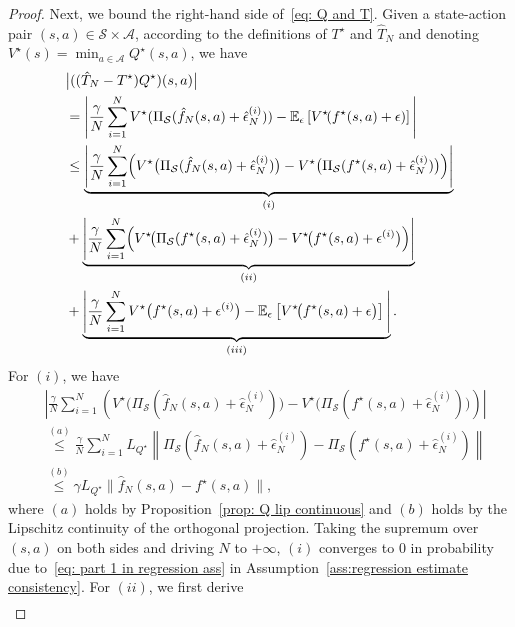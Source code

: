 \documentclass[letterpaper, 10 pt, conference]{ieeeconf}  %
\begin{document}
\begin{proof}
Next, we bound the right-hand side of\ \eqref{eq: Q and T}. Given a state-action pair $(s,a)\in\mathcal S\times\mathcal A$, according to the definitions of $T^\star$ and $\hat{T}_N$ and denoting $V^\star(s)=\min_{a\in\mathcal A}Q^\star(s,a)$, we have
\footnotesize
\begin{align*}
&\bigl|((\hat{T}_N-T^\star)Q^\star)(s,a)\bigr| \\
&=\Bigg|
\frac{\gamma}{N}\sum_{i=1}^{N}V^\star(\Pi_{\mathcal{S}}(\hat f_N(s,a)+\hat\epsilon_N^{(i)}))
- \mathbb E_\epsilon\left[V^\star\!(f^\star(s,a)+\epsilon)\right]
\Bigg|\nonumber \\
&\le \underbrace{\Bigg|
\frac{\gamma}{N}\sum_{i=1}^{N}\Bigl(
V^\star\bigl(\Pi_{\mathcal{S}}(\hat f_N(s,a)+\hat\epsilon_N^{(i)})\bigr)
-V^\star\bigl(\Pi_{\mathcal S}(f^\star(s,a)+\hat\epsilon_N^{(i)})\bigr)
\Bigr)\Bigg|}_{(i)}\\
& + \underbrace{\Bigg|
\frac{\gamma}{N}\sum_{i=1}^{N}\Bigl(
V^\star\!\bigl( \Pi_{\mathcal S}(f^\star(s,a)+\hat\epsilon_N^{(i)})\bigr)
-V^\star\!\bigl(f^\star(s,a)+\epsilon^{(i)}\bigr)
\Bigr)\Bigg|}_{(ii)}\\
& +\underbrace{ \Bigg|
\frac{\gamma}{N}\sum_{i=1}^{N}V^\star\bigl(f^\star(s,a)+\epsilon^{(i)}\bigr)
-\mathbb E_\epsilon\left[V^\star\!\bigl(f^\star(s,a)+\epsilon\bigr)\right]
\Bigg|}_{(iii)}.
\end{align*}
\normalsize
For $(i)$, we have
\allowdisplaybreaks
\small 
\begin{align}
& \left| \frac{\gamma}{N} \sum_{i=1}^N \left(
V^\star\!\bigl(\Pi_{\mathcal S}(\hat f_N(s,a)+\hat\epsilon_N^{(i)})\bigr)
-V^\star\bigl(\Pi_{\mathcal S}(f^\star(s,a)+\hat\epsilon_N^{(i)})\bigr)\right)
\right|\nonumber\\
 & \overset{(a)}{\le} \frac{\gamma}{N} \sum_{i=1}^N  L_{Q^\star}\left\|\Pi_{\mathcal S}(\hat f_N(s,a)+\hat\epsilon_N^{(i)}) - \Pi_{\mathcal S}(f^\star(s,a)+\hat\epsilon_N^{(i)})\right\| \nonumber \\
& \overset{(b)}{\le} \gamma L_{Q^\star}\|\hat f_N(s,a)-f^\star(s,a)\|,\nonumber
\end{align}
\normalsize
where $(a)$ holds by Proposition\ \ref{prop: Q lip continuous} and $(b)$ holds by the Lipschitz continuity of the orthogonal projection. Taking the supremum over $(s,a)$ on both sides and driving $N$ to $+\infty$, $(i)$ converges to $0$ in probability due to\ \eqref{eq: part 1 in regression ass} in Assumption\ \ref{ass:regression estimate consistency}.
For $(ii)$, we first derive 
\begin{align}\label{eq:hat epsilon - epsilon}

\end{align}
\end{proof}
\end{document}
